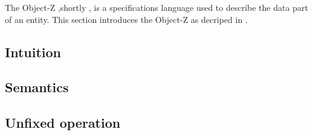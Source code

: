 The Object-Z ,shortly \oz{}, is a specifications language used to describe the data part of an entity. This section introduces the Object-Z as decriped in \cite{olderog}.
\subsection{Intuition}
\label{sec_oz_intuition}


\subsection{Semantics}
\label{sec_oz_sem}


\subsection{Unfixed operation}
\label{unfixed_operation}
